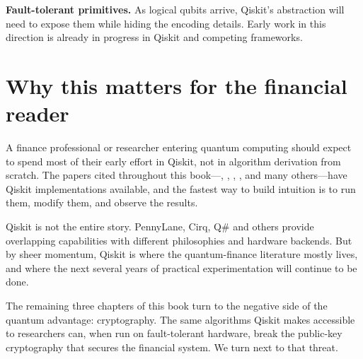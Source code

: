 \textbf{Fault-tolerant primitives.} As logical qubits arrive, Qiskit's abstraction will need to expose them while hiding the encoding details. Early work in this direction is already in progress in Qiskit and competing frameworks.

\section{Why this matters for the financial reader}

A finance professional or researcher entering quantum computing should expect to spend most of their early effort in Qiskit, not in algorithm derivation from scratch. The papers cited throughout this book---\citet{stamatopoulos_option_2020}, \citet{morapakula_end--end_2026}, \citet{ciceri_enhanced_2025}, \citet{dri_towards_2022}, and many others---have Qiskit implementations available, and the fastest way to build intuition is to run them, modify them, and observe the results.

Qiskit is not the entire story. PennyLane, Cirq, Q\# and others provide overlapping capabilities with different philosophies and hardware backends. But by sheer momentum, Qiskit is where the quantum-finance literature mostly lives, and where the next several years of practical experimentation will continue to be done.

The remaining three chapters of this book turn to the negative side of the quantum advantage: cryptography. The same algorithms Qiskit makes accessible to researchers can, when run on fault-tolerant hardware, break the public-key cryptography that secures the financial system. We turn next to that threat.

\textsep
